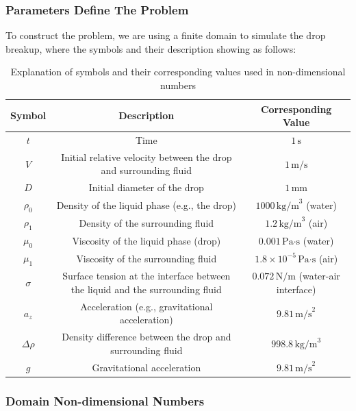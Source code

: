 \documentclass[12pt]{article}
\begin{document}
\subsubsection{Parameters Define The Problem}
To construct the problem, we are using a finite domain to simulate the drop breakup, where the symbols and their description showing as follows:
\begin{table}[ht]
\scriptsize
\centering
\caption{Explanation of symbols and their corresponding values used in non-dimensional numbers}
\renewcommand{\arraystretch}{1.5} %
\begin{tabular}{|c|c|c|}
\hline
\textbf{Symbol} & \textbf{Description} & \textbf{Corresponding Value} \\ \hline
$t$     & Time & $1 \, \text{s}$ \\ \hline
$V$     & Initial relative velocity between the drop and surrounding fluid & $1 \, \text{m/s}$ \\ \hline
$D$     & Initial diameter of the drop & $1 \, \text{mm}$ \\ \hline
$\rho_0$ & Density of the liquid phase (e.g., the drop) & $1000 \, \text{kg/m}^3$ (water) \\ \hline
$\rho_1$ & Density of the surrounding fluid & $1.2 \, \text{kg/m}^3$ (air) \\ \hline
$\mu_0$  & Viscosity of the liquid phase (drop) & $0.001 \, \text{Pa·s}$ (water) \\ \hline
$\mu_1$  & Viscosity of the surrounding fluid & $1.8 \times 10^{-5} \, \text{Pa·s}$ (air) \\ \hline
$\sigma$ & Surface tension at the interface between the liquid and the surrounding fluid & $0.072 \, \text{N/m}$ (water-air interface) \\ \hline
$a_z$ & Acceleration (e.g., gravitational acceleration) & $9.81 \, \text{m/s}^2$ \\ \hline
$\Delta \rho$ & Density difference between the drop and surrounding fluid & $998.8 \, \text{kg/m}^3$ \\ \hline
$g$ & Gravitational acceleration & $9.81 \, \text{m/s}^2$ \\ \hline
\end{tabular}
\label{tab:SymbolExplanations}
\end{table}

\subsubsection{Domain Non-dimensional Numbers}
\end{document}
